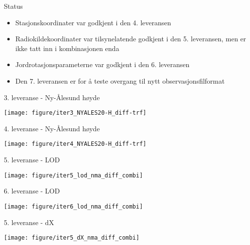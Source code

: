 \documentclass[14pt,c]{beamer}
\begin{document}
\begin{frame}{Status}
\begin{itemize}
  \item Stasjonskoordinater var godkjent i den 4. leveransen
  \item Radiokildekoordinater var tilsynelatende godkjent i den 5. leveransen, men er ikke tatt inn i kombinasjonen
  enda
  \item Jordrotasjonsparameterne var godkjent i den 6. leveransen
  \item Den 7. leveransen er for å teste overgang til nytt observasjonsfilformat
\end{itemize}
\end{frame}

\begin{frame}{3. leveranse - Ny-{\AA}lesund høyde}
\begin{centering}
    \hfill\texttt{[image: figure/iter3\_NYALES20-H\_diff-trf]}\hspace*{\fill}
\end{centering}
\end{frame}

\begin{frame}{4. leveranse - Ny-{\AA}lesund høyde}
\begin{centering}
    \hfill\texttt{[image: figure/iter4\_NYALES20-H\_diff-trf]}\hspace*{\fill}
\end{centering}
\end{frame}

\begin{frame}{5. leveranse - LOD}
\begin{centering}
    \hfill\texttt{[image: figure/iter5\_lod\_nma\_diff\_combi]}\hspace*{\fill}
\end{centering}
\end{frame}

\begin{frame}{6. leveranse - LOD}
\begin{centering}
    \hfill\texttt{[image: figure/iter6\_lod\_nma\_diff\_combi]}\hspace*{\fill}
\end{centering}
\end{frame}

\begin{frame}{5. leveranse - dX}
\begin{centering}
    \hfill\texttt{[image: figure/iter5\_dX\_nma\_diff\_combi]}\hspace*{\fill}
\end{centering}
\end{frame}
\end{document}
